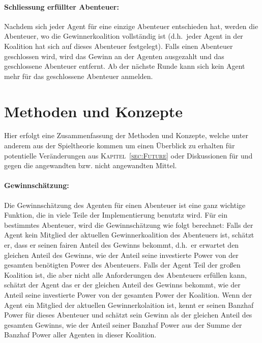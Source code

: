 \documentclass[fleqn,10pt]{article} %
\newcommand{\ChapterCite}[1]{\textsc{Kapitel~\ref{#1}}}
\begin{document}
\paragraph{Schliessung erfüllter Abenteuer:}
Nachdem sich jeder Agent für eine einzige Abenteuer entschieden hat, werden die Abenteuer, wo die Gewinnerkoalition vollständig ist (d.h.\ jeder Agent in der Koalition hat sich auf dieses Abenteuer festgelegt). Falls einen Abenteuer geschlossen wird, wird das Gewinn an der Agenten ausgezahlt und das geschlossene Abenteuer entfernt. Ab der nächste Runde kann sich kein Agent mehr für das geschlossene Abenteuer anmelden.

\section{Methoden und Konzepte}
\label{sec:Methoden}
Hier erfolgt eine Zusammenfassung der Methoden und Konzepte, welche unter anderem aus der Spieltheorie kommen um einen Überblick zu erhalten für potentielle Veränderungen aus \ChapterCite{sec:Future} oder Diskussionen für und gegen die angewandten bzw. nicht angewandten Mittel.

\paragraph{Gewinnschätzung:}
Die Gewinnschätzung des Agenten für einen Abenteuer ist eine ganz wichtige Funktion, die in viele Teile der Implementierung benutztz wird.
Für ein bestimmtes Abenteuer, wird die Gewinnschätzung wie folgt berechnet: Falls der Agent kein Mitglied der aktuellen Gewinnerkoalition des Abenteuers ist, schätzt er, dass er seinen fairen Anteil des Gewinns bekommt, d.h.\ er erwartet den gleichen Anteil des Gewinns, wie der Anteil seine investierte Power von der gesamten benötigten Power des Abenteuers. Falls der Agent Teil der großen Koalition ist, die aber nicht alle Anforderungen des Abenteuers erfüllen kann, schätzt der Agent das er der gleichen Anteil des Gewinns bekommt, wie der Anteil seine investierte Power von der gesamten Power der Koalition. Wenn der Agent ein Mitglied der aktuellen Gewinnerkolaition ist, kennt er seinen Banzhaf Power für dieses Abenteuer und schätzt sein Gewinn als der gleichen Anteil des gesamten Gewinns, wie der Anteil seiner Banzhaf Power aus der Summe der Banzhaf Power aller Agenten in dieser Koalition.
\end{document}

